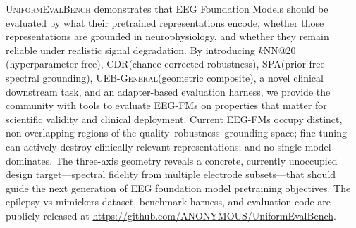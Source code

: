 \documentclass{article}
\newcommand{\bench}{\textsc{UniformEvalBench}\xspace}
\newcommand{\cdr}{\textsc{CDR}\xspace}
\newcommand{\spa}{\textsc{SPA}\xspace}
\newcommand{\uebgen}{\textsc{UEB-General}\xspace}
\newcommand{\codeurl}{\url{https://github.com/ANONYMOUS/UniformEvalBench}}
\begin{document}
\bench demonstrates that EEG Foundation Models should be evaluated by what their pretrained representations encode, whether those representations are grounded in neurophysiology, and whether they remain reliable under realistic signal degradation. By introducing $k$NN@20 (hyperparameter-free), \cdr (chance-corrected robustness), \spa (prior-free spectral grounding), \uebgen (geometric composite), a novel clinical downstream task, and an adapter-based evaluation harness, we provide the community with tools to evaluate EEG-FMs on properties that matter for scientific validity and clinical deployment. Current EEG-FMs occupy distinct, non-overlapping regions of the quality--robustness--grounding space; fine-tuning can actively destroy clinically relevant representations; and no single model dominates. The three-axis geometry reveals a concrete, currently unoccupied design target---spectral fidelity from multiple electrode subsets---that should guide the next generation of EEG foundation model pretraining objectives. The epilepsy-vs-mimickers dataset, benchmark harness, and evaluation code are publicly released at \codeurl.
\end{document}
